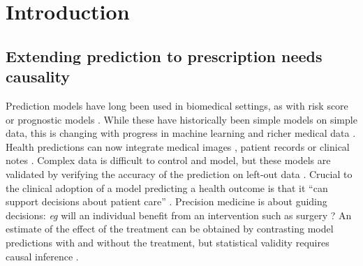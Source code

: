 \documentclass[a4paper,num-refs]{oup-contemporary}%
\begin{document}

\section{Introduction}

\subsection{Extending prediction to prescription needs causality}

Prediction models have long been used in biomedical settings, as with risk
score or prognostic models \cite{moons2009prognosis,steyerberg2019clinical}.
While these have historically been simple models on simple data, this is
changing with progress in machine learning and richer medical data
\cite{beam2018big,rajkomar2019machine}. Health predictions can now integrate medical images
\cite{khojaste2022deep,zhang2019radiological,yala2019deep,shen2019deep,nassif2022breast},
patient records
\cite{mooney2018bigdata,desai2020comparison,simon2018predicting} or clinical
notes \cite{horng2017creating,wang2020prediction,spasic2020clinical}.
Complex data is difficult to control and model, but these models are
validated by verifying the accuracy of the prediction on left-out data
\cite{altman2009prognosis,poldrack2020establishment,varoquaux2022evaluating}.
Crucial to the clinical adoption of a model predicting a health outcome
is that it ``can support decisions about patient care''
\cite{wyatt1995commentary}. Precision medicine is about
guiding decisions: \emph{eg} will an individual benefit from an intervention such as surgery
\cite{fontana2019can}? An estimate of the effect of the treatment can be
obtained by contrasting model predictions with and without the treatment,
but statistical validity requires causal inference
\cite{snowden_implementation_2011,sperrin2019explicit,blakely2020reflection}.

\end{document}
